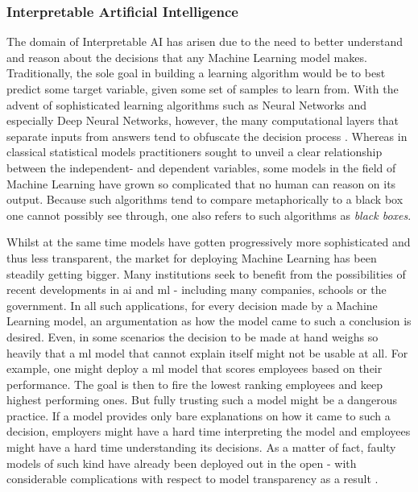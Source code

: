 \documentclass[../main.tex]{subfiles}
\begin{document}
\subsubsection{Interpretable Artificial Intelligence}
The domain of Interpretable AI has arisen due to the need to better understand and reason about the decisions that any Machine Learning model makes. Traditionally, the sole goal in building a learning algorithm would be to best predict some target variable, given some set of samples to learn from. With the advent of sophisticated learning algorithms such as Neural Networks and especially Deep Neural Networks, however, the many computational layers that separate inputs from answers tend to obfuscate the decision process \citep{rai_explainable_2020}. Whereas in classical statistical models practitioners sought to unveil a clear relationship between the independent- and dependent variables, some models in the field of Machine Learning have grown so complicated that no human can reason on its output. Because such algorithms tend to compare metaphorically to a black box one cannot possibly see through, one also refers to such algorithms as \textit{black boxes}.

Whilst at the same time models have gotten progressively more sophisticated and thus less transparent, the market for deploying Machine Learning has been steadily getting bigger. Many institutions seek to benefit from the possibilities of recent developments in \gls{ai} and \gls{ml} - including many companies, schools or the government. In all such applications, for every decision made by a Machine Learning model, an argumentation as how the model came to such a conclusion is desired. Even, in some scenarios the decision to be made at hand weighs so heavily that a \gls{ml} model that cannot explain itself might not be usable at all. For example, one might deploy a \gls{ml} model that scores employees based on their performance. The goal is then to fire the lowest ranking employees and keep highest performing ones. But fully trusting such a model might be a dangerous practice. If a model provides only bare explanations on how it came to such a decision, employers might have a hard time interpreting the model and employees might have a hard time understanding its decisions. As a matter of fact, faulty models of such kind have already been deployed out in the open - with considerable complications with respect to model transparency as a result \citep{oneil_weapons_2016}.
\end{document}
